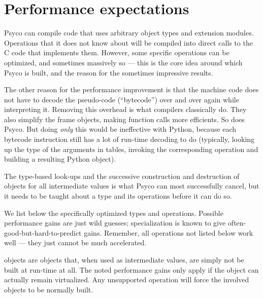 \documentclass{manual}
\begin{document}
\chapter{Performance expectations}

Psyco can compile code that uses arbitrary object types and extension modules.  Operations that it does not know about will be compiled into direct calls to the C code that implements them.  However, some specific operations can be optimized, and sometimes massively so --- this is the core idea around which Psyco is built, and the reason for the sometimes impressive results.

The other reason for the performance improvement is that the machine code does not have to decode the pseudo-code (``bytecode'') over and over again while interpreting it.  Removing this overhead is what compilers classically do.  They also simplify the frame objects, making function calls more efficients.  So does Psyco.  But doing \emph{only} this would be ineffective with Python, because each bytecode instruction still has a lot of run-time decoding to do (typically, looking up the type of the arguments in tables, invoking the corresponding operation and building a resulting Python object).

The type-based look-ups and the successive construction and destruction of objects for all intermediate values is what Psyco can most successfully cancel, but it needs to be taught about a type and its operations before it can do so.

We list below the specifically optimized types and operations.  Possible performance gains are just wild guesses; specialization is known to give often-good-but-hard-to-predict gains.  Remember, all operations not listed below work well --- they just cannot be much accelerated.

 objects are objects that, when used as intermediate values, are simply not be built at run-time at all.  The noted performance gains only apply if the object can actually remain virtualized.  Any unsupported operation will force the involved objects to be normally built.
\end{document}
